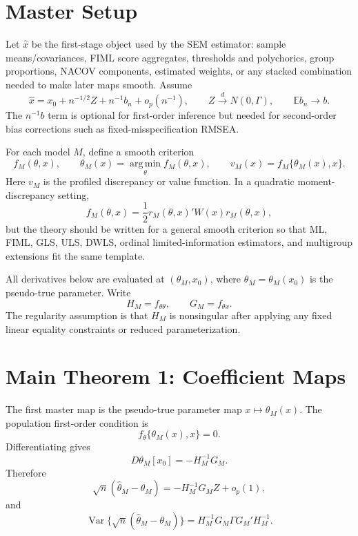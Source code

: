 \documentclass[11pt]{article}
\newcommand{\E}{\mathbb{E}}
\newcommand{\Var}{\operatorname{Var}}
\newcommand{\argmin}{\operatorname*{arg\,min}}
\newcommand{\dto}{\xrightarrow{d}}
\theoremstyle{plain}
\theoremstyle{remark}
\begin{document}
\section{Master Setup}

Let $\hat x$ be the first-stage object used by the SEM estimator:
sample means/covariances, FIML score aggregates, thresholds and polychorics,
group proportions, NACOV components, estimated weights, or any stacked
combination needed to make later maps smooth. Assume
\begin{equation}\label{eq:first-stage}
  \hat x
  =
  x_0+n^{-1/2}Z+n^{-1}b_n+o_p(n^{-1}),
  \qquad
  Z\dto N(0,\Gamma),
  \qquad
  \E b_n\to b .
\end{equation}
The $n^{-1}b$ term is optional for first-order inference but needed for
second-order bias corrections such as fixed-misspecification RMSEA.

For each model $M$, define a smooth criterion
\[
  f_M(\theta,x),
  \qquad
  \theta_M(x)=\argmin_\theta f_M(\theta,x),
  \qquad
  v_M(x)=f_M\{\theta_M(x),x\}.
\]
Here $v_M$ is the profiled discrepancy or value function. In a quadratic
moment-discrepancy setting,
\[
  f_M(\theta,x)
  =
  \frac12 r_M(\theta,x)'W(x)r_M(\theta,x),
\]
but the theory should be written for a general smooth criterion so that ML,
FIML, GLS, ULS, DWLS, ordinal limited-information estimators, and multigroup
extensions fit the same template.

All derivatives below are evaluated at $(\theta_M,x_0)$, where
$\theta_M=\theta_M(x_0)$ is the pseudo-true parameter. Write
\[
  H_M=f_{\theta\theta},
  \qquad
  G_M=f_{\theta x}.
\]
The regularity assumption is that $H_M$ is nonsingular after applying any fixed
linear equality constraints or reduced parameterization.

\section{Main Theorem 1: Coefficient Maps}

The first master map is the pseudo-true parameter map $x\mapsto\theta_M(x)$.
The population first-order condition is
\[
  f_\theta\{\theta_M(x),x\}=0 .
\]
Differentiating gives
\[
  D\theta_M[x_0] = -H_M^{-1}G_M .
\]
Therefore
\begin{equation}\label{eq:theta-if}
  \sqrt n(\hat\theta_M-\theta_M)
  =
  -H_M^{-1}G_M Z+o_p(1),
\end{equation}
and
\begin{equation}\label{eq:theta-vcov}
  \Var\{\sqrt n(\hat\theta_M-\theta_M)\}
  =
  H_M^{-1}G_M\Gamma G_M'H_M^{-1}.
\end{equation}
\end{document}
